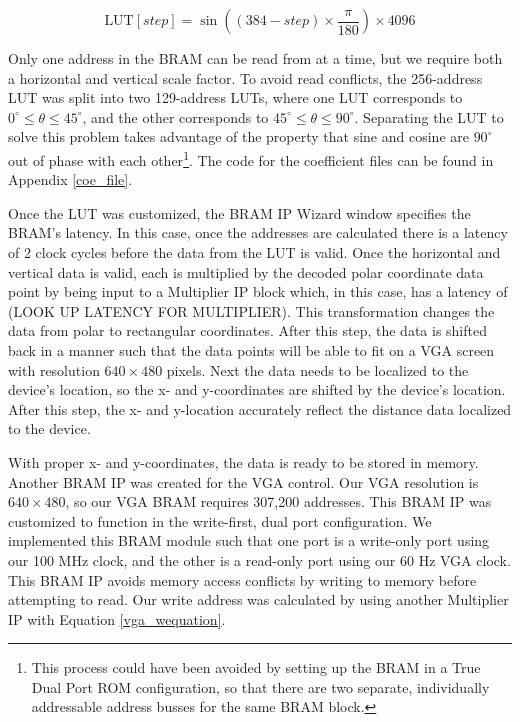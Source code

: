 \begin{equation}
	\textrm{LUT}[step] = \sin((384-step)\times\dfrac{\pi}{180})\times4096
	\label{coe}
\end{equation}

Only one address in the BRAM can be read from at a time, but we require both a horizontal and vertical scale factor. To avoid read conflicts, the 256-address LUT was split into two 129-address LUTs, where one LUT corresponds to $0^\circ{}\leq{}\theta{}\leq45^\circ$, and the other corresponds to $45^\circ{}\leq{}\theta{}\leq90^\circ$. Separating the LUT to solve this problem takes advantage of the property that sine and cosine are $90^\circ$ out of phase with each other\footnote{This process could have been avoided by setting up the BRAM in a True Dual Port ROM configuration, so that there are two separate, individually addressable address busses for the same BRAM block.}. The code for the coefficient files can be found in Appendix \ref{coe_file}.
\par
Once the LUT was customized, the BRAM IP Wizard window specifies the BRAM's latency. In this case, once the addresses are calculated there is a latency of 2 clock cycles before the data from the LUT is valid. Once the horizontal and vertical data is valid, each is multiplied by the decoded polar coordinate data point by being input to a Multiplier IP block which, in this case, has a latency of (LOOK UP LATENCY FOR MULTIPLIER). This transformation changes the data from polar to rectangular coordinates. After this step, the data is shifted back in a manner such that the data points will be able to fit on a VGA screen with resolution $640\times480$ pixels. Next the data needs to be localized to the device's location, so the x- and y-coordinates are shifted by the device's location. After this step, the x- and y-location accurately reflect the distance data localized to the device.
\par
With proper x- and y-coordinates, the data is ready to be stored in memory. Another BRAM IP was created for the VGA control. Our VGA resolution is $640\times480$, so our VGA BRAM requires 307,200 addresses. This BRAM IP was customized to function in the write-first, dual port configuration. We implemented this BRAM module such that one port is a write-only port using our 100 MHz clock, and the other is a read-only port using our 60 Hz VGA clock. This BRAM IP avoids memory access conflicts by writing to memory before attempting to read. Our write address was calculated by using another Multiplier IP with Equation \ref{vga_wequation}.

